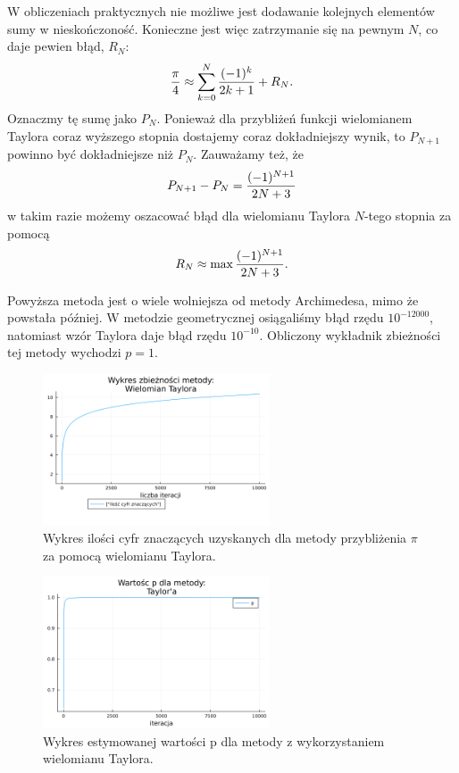 W obliczeniach praktycznych nie możliwe jest dodawanie kolejnych elementów sumy w nieskończoność. Konieczne jest więc zatrzymanie się na pewnym $N$, co daje pewien błąd, $R_N$:
$$\frac\pi4\approx \sum\limits_{k=0}^N{(-1)^k\over 2k+1}+R_N.$$
Oznaczmy tę sumę jako $P_N$. Ponieważ dla przybliżeń funkcji wielomianem Taylora coraz wyższego stopnia dostajemy coraz dokładniejszy wynik, to $P_{N+1}$ powinno być dokładniejsze niż $P_N$. Zauważamy też, że
$$P_{N+1}-P_N={(-1)^{N+1}\over 2N+3}$$
w takim razie możemy oszacować błąd dla wielomianu Taylora $N$-tego stopnia za pomocą
$$R_N\approx \max{(-1)^{N+1}\over 2N+3}.$$

Powyższa metoda jest o wiele wolniejsza od metody Archimedesa, mimo że powstała później. W metodzie geometrycznej osiągaliśmy błąd rzędu $10^{-12000}$, natomiast wzór Taylora daje błąd rzędu $10^{-10}$. Obliczony wykładnik zbieżności tej metody wychodzi $p = 1$.

\begin{figure}[!h]\centering
    \renewcommand{\figurename}{Wykres}
    \includegraphics[width=0.6\textwidth]{../prog/taylor_log_error.png}
    \caption{Wykres ilości cyfr znaczących uzyskanych dla metody przybliżenia  $\pi$ za pomocą wielomianu Taylora.}
    \label{taylor-series-error}
\end{figure}

\begin{figure}[!h]\centering
    \renewcommand{\figurename}{Wykres}
    \includegraphics[width=0.6\textwidth]{../prog/taylor_error_ratio.png}
    \caption{Wykres estymowanej wartości p dla metody z wykorzystaniem wielomianu Taylora.}
    \label{taylor-series-convergence}
\end{figure}


